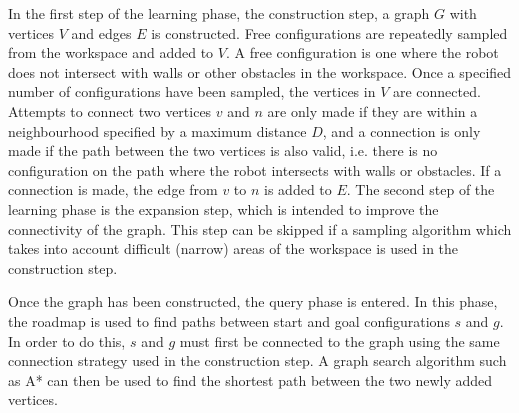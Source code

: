 \documentclass[conference]{IEEEtran}
\begin{document}
In the first step of the learning phase, the construction step, a graph $G$ with vertices $V$ and edges $E$ is constructed. Free configurations are repeatedly sampled from the workspace and added to $V$. A free configuration is one where the robot does not intersect with walls or other obstacles in the workspace. Once a specified number of configurations have been sampled, the vertices in $V$ are connected. Attempts to connect two vertices $v$ and $n$ are only made if they are within a neighbourhood specified by a maximum distance $D$, and a connection is only made if the path between the two vertices is also valid, i.e. there is no configuration on the path where the robot intersects with walls or obstacles. If a connection is made, the edge from $v$ to $n$ is added to $E$. The second step of the learning phase is the expansion step, which is intended to improve the connectivity of the graph. This step can be skipped if a sampling algorithm which takes into account difficult (narrow) areas of the workspace is used in the construction step.

Once the graph has been constructed, the query phase is entered. In this phase, the roadmap is used to find paths between start and goal configurations $s$ and $g$. In order to do this, $s$ and $g$ must first be connected to the graph using the same connection strategy used in the construction step. A graph search algorithm such as A* can then be used to find the shortest path between the two newly added vertices.
\end{document}

